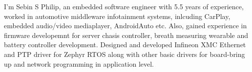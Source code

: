 \documentclass[
	a4paper, %
	11pt, %
]{resume} %
\begin{document}
\begin{rSection}{}
    I'm Sebin S Philip, an embedded software engineer with 5.5 years of experience, worked in automotive middleware infotainment systems, inlcuding 
    CarPlay, embedded audio/video mediaplayer, AndroidAuto etc. Also, gained experience in firmware developemnt for server
    chasis controller, breath measuring wearable and battery controller development. Designed and developed Infineon XMC Ethernet 
    and PTP driver for Zephyr RTOS along with other basic drivers for board-bring up and network programming in application level.
\end{rSection}
\end{document}
